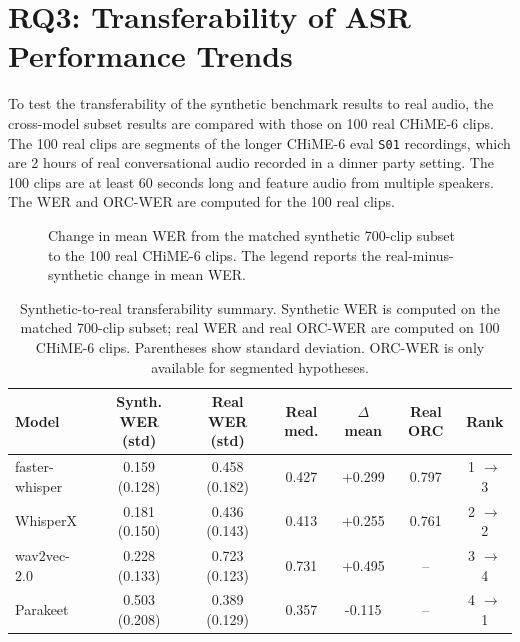 \section{RQ3: Transferability of ASR Performance Trends}
\label{sec:rq3_transferability}

To test the transferability of the synthetic benchmark results to real audio, the cross-model subset results are compared with those on 100 real CHiME-6 clips. The 100 real clips are segments of the longer CHiME-6 eval \texttt{S01} recordings, which are 2 hours of real conversational audio recorded in a dinner party setting. The 100 clips are at least 60 seconds long and feature audio from multiple speakers. The WER and ORC-WER are computed for the 100 real clips.

\begin{figure}[htbp]
    \centering
    \caption{Change in mean WER from the matched synthetic 700-clip subset to the 100 real CHiME-6 clips. The legend reports the real-minus-synthetic change in mean WER.}
    \label{fig:stat_real_transfer_wer_change}
\end{figure}

\begin{table}[htbp]
\centering
\caption{Synthetic-to-real transferability summary. Synthetic WER is computed on the matched 700-clip subset; real WER and real ORC-WER are computed on 100 CHiME-6 clips. Parentheses show standard deviation. ORC-WER is only available for segmented hypotheses.}
\label{tab:real_transferability_summary}
\footnotesize
\setlength{\tabcolsep}{3pt}
\begin{tabular}{lcccccc}
\toprule
\textbf{Model} & \textbf{Synth. WER (std)}  & \textbf{Real WER (std)} & \textbf{Real med.} & \textbf{$\Delta$ mean} & \textbf{Real ORC} & \textbf{Rank} \\
\midrule
faster-whisper & 0.159 (0.128) & 0.458 (0.182) & 0.427 & +0.299 & 0.797 & 1 $\rightarrow$ 3 \\
WhisperX & 0.181 (0.150) & 0.436 (0.143) & 0.413 & +0.255 & 0.761 & 2 $\rightarrow$ 2 \\
wav2vec-2.0 & 0.228 (0.133) & 0.723 (0.123) & 0.731 & +0.495 & -- & 3 $\rightarrow$ 4 \\
Parakeet & 0.503 (0.208) & 0.389 (0.129) & 0.357 & -0.115 & -- & 4 $\rightarrow$ 1 \\
\bottomrule
\end{tabular}
\setlength{\tabcolsep}{6pt}
\normalsize
\end{table}

